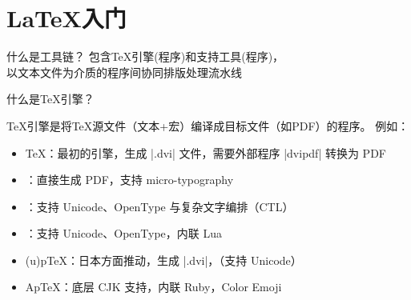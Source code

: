 
\section{\LaTeX{}入门}

\begin{frame}{\secname}
  \centering
\end{frame}

\begin{frame}{什么是工具链？}
  包含\TeX{}引擎(程序)和支持工具(程序)，\\
  以文本文件为介质的程序间协同排版处理流水线
  \pause
  \centering
  
\end{frame}

\begin{frame}{什么是\TeX{}引擎？}

  \TeX{}引擎是将\TeX{}源文件（文本+宏）编译成目标文件（如PDF）的程序。
  \pause{}例如：
  \begin{itemize}
    \item \TeX{}：最初的引擎，生成 |.dvi| 文件，需要外部程序 |dvipdf| 转换为 PDF
    \item \pdfTeX{}：直接生成 PDF，支持 micro-typography
    \item \XeTeX{}：支持 Unicode、OpenType 与复杂文字编排（CTL）
    \item \LuaTeX{}：支持 Unicode、OpenType，内联 Lua
    \item (u)p\TeX{}：日本方面推动，生成 |.dvi|，（支持 Unicode）
    \item Ap\TeX{}：底层 CJK 支持，内联 Ruby，Color Emoji 
  \end{itemize}
\end{frame}


